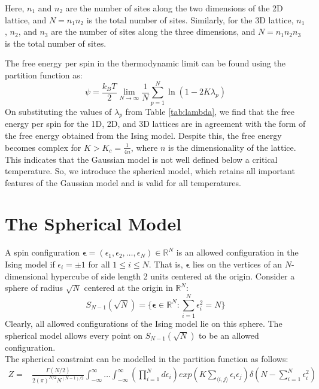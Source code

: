 \documentclass{article}
\begin{document}
Here, $n_1$ and $n_2$ are the number of sites along the two dimensions of the 2D lattice, and $N = n_1 n_2$ is the total number of sites. Similarly, for the 3D lattice, $n_1$, $n_2$, and $n_3$ are the number of sites along the three dimensions, and $N = n_1 n_2 n_3$ is the total number of sites.

The free energy per spin in the thermodynamic limit can be found using the partition function as:
\begin{equation}
    \psi = \frac{k_B T}{2} \lim_{N \rightarrow \infty} \frac{1}{N} \sum_{p=1}^{N} \ln(1 - 2 K \lambda_p)
\end{equation}
On substituting the values of $\lambda_p$ from Table \ref{tab:lambda}, we find that the free energy per spin for the 1D, 2D, and 3D lattices are in agreement with the form of the free energy obtained from the Ising model. 
Despite this, the free energy becomes complex for $K > K_c = \frac{1}{4 n}$, where $n$ is the dimensionality of the lattice. This indicates that the Gaussian model is not well defined below a critical temperature. So,
we introduce the spherical model, which retains all important features of the Gaussian model and is valid for all temperatures.

\section{The Spherical Model}
A spin configuration $\mathbf{\epsilon} = (\epsilon_1, \epsilon_2, \ldots, \epsilon_N) \in \mathbb{R}^N$ is an allowed configuration in the Ising model if $\epsilon_i = \pm 1$ for all $1 \leq i \leq N$. That is, $\mathbf{\epsilon}$ lies on the vertices of an $N$-dimensional hypercube of side length 2 units centered at the origin. 
Consider a sphere of radius $\sqrt{N}$ centered at the origin in $\mathbb{R}^N$:
\begin{equation}
S_{N-1}(\sqrt{N}) = \{ \mathbf{\epsilon} \in \mathbb{R}^N : \sum_{i=1}^{N} \epsilon_i^2 = N \} 
\end{equation}
Clearly, all allowed configurations of the Ising model lie on this sphere. The spherical model allows every point on $S_{N-1}(\sqrt{N})$ to be an allowed configuration. \\

The spherical constraint can be modelled in the partition function as follows:
\begin{align}
    Z = & \frac{\Gamma(N/2)}{2(\pi)^{N/2} N^{(N-1)/2}} \int_{-\infty}^{\infty} \ldots \int_{-\infty}^{\infty} \left( \prod_{i=1}^{N} d\epsilon_i \right) exp \left( K \sum_{\langle i,j \rangle} \epsilon_i \epsilon_j \right) \delta \left( N - \sum_{i=1}^{N} \epsilon_i^2 \right) 
\end{align}

 

\nocite{*}
\end{document}
